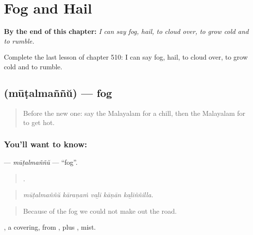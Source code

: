 
\chapter{Fog and Hail}
\label{ch:ml-fog-and-hail}

\begin{chapteropening}
\textbf{By the end of this chapter:} \emph{I can say fog, hail, to cloud over, to grow cold and to rumble.}

Complete the last lesson of chapter 510: I can say fog, hail, to cloud over, to grow cold and to rumble.
\end{chapteropening}

\section[\texorpdfstring{\ml{മൂടൽമഞ്ഞ്} (mūṭalmaññŭ)}{മൂടൽമഞ്ഞ് (mūṭalmaññŭ)}]{ (mūṭalmaññŭ) — fog}

\label{lesson:ML-C510-mutalmannu}



\begin{quote}
Before the new one: say the Malayalam for a chill, then the Malayalam for to get hot.
\end{quote}

\subsection*{You'll want to know: }
\textbf{} — \emph{mūṭalmaññŭ} — \textquotedblleft{}fog\textquotedblright{}.

\begin{quote}
    .
\end{quote}

\begin{quote}
\emph{mūṭalmaññŭ kāraṇaṁ vaḻi kāṇān kaḻiññilla.}
\end{quote}

\begin{quote}
Because of the fog we could not make out the road.
\end{quote}

, a covering, from , plus , mist.

